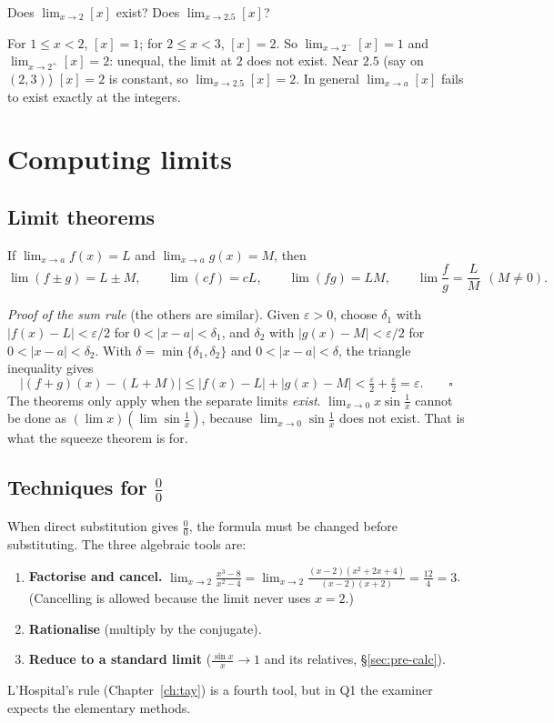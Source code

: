 \begin{example}
Does $\lim_{x\to2}[x]$ exist? Does $\lim_{x\to 2.5}[x]$?
\end{example}
\begin{solution}
For $1\le x<2$, $[x]=1$; for $2\le x<3$, $[x]=2$. So $\lim_{x\to2^-}[x]=1$ and $\lim_{x\to2^+}[x]=2$: unequal, the limit at $2$ does not exist. Near $2.5$ (say on $(2,3)$) $[x]=2$ is constant, so $\lim_{x\to2.5}[x]=2$. In general $\lim_{x\to a}[x]$ fails to exist exactly at the integers.
\end{solution}

\section{Computing limits}\label{sec:lim-comp}

\subsection{Limit theorems}
\begin{theorem}
If $\lim_{x\to a}f(x)=L$ and $\lim_{x\to a}g(x)=M$, then
\[
\lim(f\pm g)=L\pm M,\qquad \lim(cf)=cL,\qquad \lim(fg)=LM,\qquad \lim\frac fg=\frac LM\ \ (M\ne0).
\]
\end{theorem}
\emph{Proof of the sum rule} (the others are similar). Given $\varepsilon>0$, choose $\delta_1$ with $|f(x)-L|<\varepsilon/2$ for $0<|x-a|<\delta_1$, and $\delta_2$ with $|g(x)-M|<\varepsilon/2$ for $0<|x-a|<\delta_2$. With $\delta=\min\{\delta_1,\delta_2\}$ and $0<|x-a|<\delta$, the triangle inequality gives
\[
|(f+g)(x)-(L+M)|\le|f(x)-L|+|g(x)-M|<\tfrac\varepsilon2+\tfrac\varepsilon2=\varepsilon. \qquad\square
\]
The theorems only apply when the separate limits \emph{exist}. $\lim_{x\to0}x\sin\frac1x$ cannot be done as $(\lim x)(\lim\sin\frac1x)$, because $\lim_{x\to0}\sin\frac1x$ does not exist. That is what the squeeze theorem is for.

\subsection{Techniques for \texorpdfstring{$\frac00$}{0/0}}
When direct substitution gives $\frac00$, the formula must be changed before substituting. The three algebraic tools are:
\begin{enumerate}
\item \textbf{Factorise and cancel.} $\displaystyle\lim_{x\to2}\frac{x^3-8}{x^2-4}=\lim_{x\to2}\frac{(x-2)(x^2+2x+4)}{(x-2)(x+2)}=\frac{12}{4}=3$. (Cancelling is allowed because the limit never uses $x=2$.)
\item \textbf{Rationalise} (multiply by the conjugate).
\item \textbf{Reduce to a standard limit} ($\frac{\sin x}{x}\to1$ and its relatives, \S\ref{sec:pre-calc}).
\end{enumerate}
L'Hospital's rule (Chapter~\ref{ch:tay}) is a fourth tool, but in Q1 the examiner expects the elementary methods.


